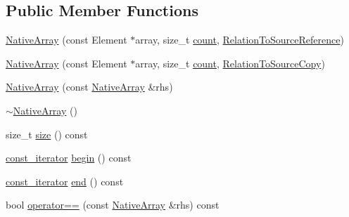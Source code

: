 \subsection*{Public Member Functions}
\begin{DoxyCompactItemize}
\item 
\mbox{\hyperlink{classtesting_1_1internal_1_1_native_array_a52b3689c62532703d11e9d82939a7141}{Native\+Array}} (const Element $\ast$array, size\+\_\+t \mbox{\hyperlink{_obj__test_2lib_2googletest-release-1_88_81_2googlemock_2test_2gmock__stress__test_8cc_afd9db40e3361ae09188795e8cbe19752}{count}}, \mbox{\hyperlink{structtesting_1_1internal_1_1_relation_to_source_reference}{Relation\+To\+Source\+Reference}})
\item 
\mbox{\hyperlink{classtesting_1_1internal_1_1_native_array_ac184ee5741af5be3402213819c834405}{Native\+Array}} (const Element $\ast$array, size\+\_\+t \mbox{\hyperlink{_obj__test_2lib_2googletest-release-1_88_81_2googlemock_2test_2gmock__stress__test_8cc_afd9db40e3361ae09188795e8cbe19752}{count}}, \mbox{\hyperlink{structtesting_1_1internal_1_1_relation_to_source_copy}{Relation\+To\+Source\+Copy}})
\item 
\mbox{\hyperlink{classtesting_1_1internal_1_1_native_array_abb346ac3040f5da733f594cc2d5958bc}{Native\+Array}} (const \mbox{\hyperlink{classtesting_1_1internal_1_1_native_array}{Native\+Array}} \&rhs)
\item 
\mbox{\hyperlink{classtesting_1_1internal_1_1_native_array_a55ab5948d473a487303dcf6e02ad1f60}{$\sim$\+Native\+Array}} ()
\item 
size\+\_\+t \mbox{\hyperlink{classtesting_1_1internal_1_1_native_array_af96a4a5ca0cdd5d163c47a081f08bd89}{size}} () const
\item 
\mbox{\hyperlink{classtesting_1_1internal_1_1_native_array_a9ce7c8408460d7158a2870456d134557}{const\+\_\+iterator}} \mbox{\hyperlink{classtesting_1_1internal_1_1_native_array_a3046d93cfa23097e7b7c91f5f982dc78}{begin}} () const
\item 
\mbox{\hyperlink{classtesting_1_1internal_1_1_native_array_a9ce7c8408460d7158a2870456d134557}{const\+\_\+iterator}} \mbox{\hyperlink{classtesting_1_1internal_1_1_native_array_ae1cda748e49c6906421c6183c4d07c5a}{end}} () const
\item 
bool \mbox{\hyperlink{classtesting_1_1internal_1_1_native_array_a81b90f5739ed812610e68dc34c9e3850}{operator==}} (const \mbox{\hyperlink{classtesting_1_1internal_1_1_native_array}{Native\+Array}} \&rhs) const
\item 

\end{DoxyCompactItemize}
